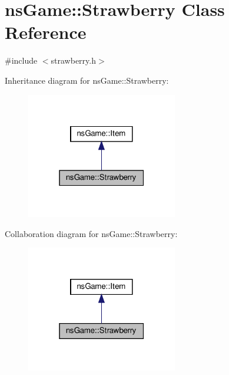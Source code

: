 \hypertarget{classns_game_1_1_strawberry}{}\section{ns\+Game\+:\+:Strawberry Class Reference}
\label{classns_game_1_1_strawberry}


{\ttfamily \#include $<$strawberry.\+h$>$}



Inheritance diagram for ns\+Game\+:\+:Strawberry\+:
\nopagebreak
\begin{figure}[H]
\begin{center}
\leavevmode
\includegraphics[width=187pt]{classns_game_1_1_strawberry__inherit__graph}
\end{center}
\end{figure}


Collaboration diagram for ns\+Game\+:\+:Strawberry\+:
\nopagebreak
\begin{figure}[H]
\begin{center}
\leavevmode
\includegraphics[width=187pt]{classns_game_1_1_strawberry__coll__graph}
\end{center}
\end{figure}
